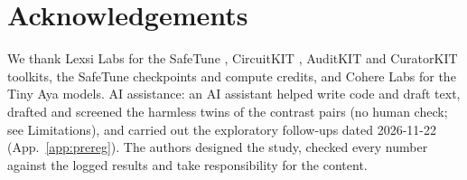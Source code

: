 \documentclass[11pt]{article}
\begin{document}
\section*{Acknowledgements}

We thank Lexsi Labs for the SafeTune \citep{seth2026safetune}, CircuitKIT \citep{seth2026circuitkit}, AuditKIT \citep{lexsi2026auditkit} and CuratorKIT \citep{bhattacharjee2026curatorkit} toolkits, the SafeTune checkpoints and
compute credits, and Cohere Labs for the Tiny Aya models. AI assistance: an AI assistant helped write code and draft
text, drafted and screened the harmless twins of the contrast pairs (no human check; see Limitations), and carried out
the exploratory follow-ups dated 2026-11-22 (App.~\ref{app:prereg}). The authors designed the study, checked every
number against the logged results and take responsibility for the content.



\appendix
\renewcommand{\topfraction}{0.9}\renewcommand{\dbltopfraction}{0.9}\renewcommand{\textfraction}{0.07}
\renewcommand{\floatpagefraction}{0.8}\renewcommand{\dblfloatpagefraction}{0.8}
\setcounter{topnumber}{4}\setcounter{dbltopnumber}{4}\setcounter{totalnumber}{6}
\end{document}
